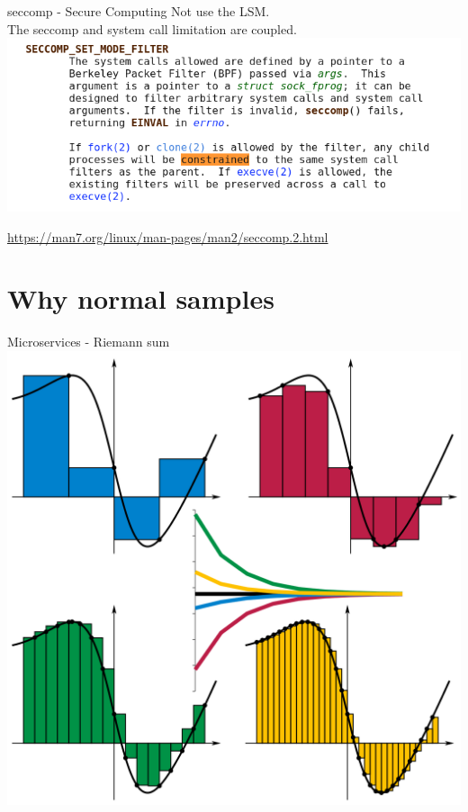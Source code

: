 \documentclass{beamer}
\begin{document}
\begin{CJK*}{UTF8}{bsmi}
  \begin{frame}{seccomp - Secure Computing}
    Not use the LSM.\\
    The seccomp and system call limitation are coupled.
    \includegraphics[width=\textwidth]{seccomp_man.png}

    \footnotesize
    \url{https://man7.org/linux/man-pages/man2/seccomp.2.html}
  \end{frame}

  \section{Why normal samples}
  \begin{frame}{Microservices - Riemann sum}
    \centering
    \includegraphics[height=.8\textheight]{Riemann_sum_convergence.png}


\end{frame}
\end{CJK*}
\end{document}
